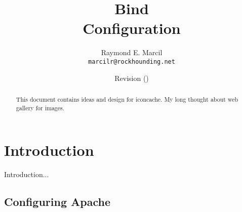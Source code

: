 \documentclass[12pt,letterpaper,dvips]{article}
\title{Bind\\
       Configuration}
\author{Raymond E. Marcil\\
        \texttt{marcilr@rockhounding.net}}
\date{Revision \RCSRevision
      \hspace{2pt}
      (\RCSDate)}
\begin{document}
\maketitle

\begin{abstract}
     This document contains ideas and design for
     iconcache. My long thought about web gallery
     for images.
\end{abstract}

\vspace{2.0in}



\newpage


\tableofcontents


\newpage



\newpage
\section{Introduction}
Introduction...


\subsection{Configuring Apache}
\end{document}
